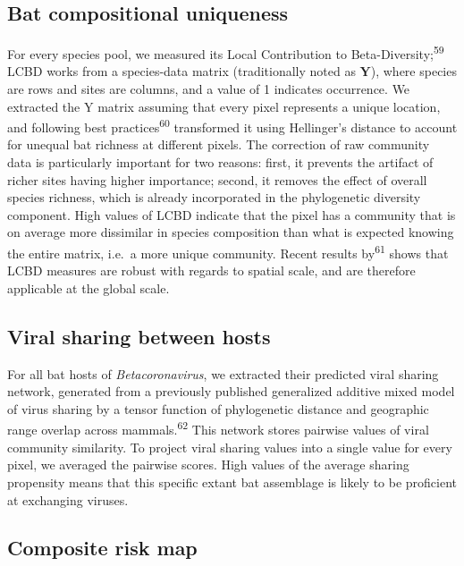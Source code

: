\documentclass[11pt]{article}
\begin{document}
\hypertarget{bat-compositional-uniqueness}{%
\subsection{Bat compositional
uniqueness}\label{bat-compositional-uniqueness}}

For every species pool, we measured its Local Contribution to
Beta-Diversity;\textsuperscript{59} LCBD works from a species-data
matrix (traditionally noted as \(\mathbf{Y}\)), where species are rows
and sites are columns, and a value of 1 indicates occurrence. We
extracted the Y matrix assuming that every pixel represents a unique
location, and following best practices\textsuperscript{60} transformed
it using Hellinger's distance to account for unequal bat richness at
different pixels. The correction of raw community data is particularly
important for two reasons: first, it prevents the artifact of richer
sites having higher importance; second, it removes the effect of overall
species richness, which is already incorporated in the phylogenetic
diversity component. High values of LCBD indicate that the pixel has a
community that is on average more dissimilar in species composition than
what is expected knowing the entire matrix, i.e.~a more unique
community. Recent results by\textsuperscript{61} shows that LCBD
measures are robust with regards to spatial scale, and are therefore
applicable at the global scale.

\hypertarget{viral-sharing-between-hosts}{%
\subsection{Viral sharing between
hosts}\label{viral-sharing-between-hosts}}

For all bat hosts of \emph{Betacoronavirus}, we extracted their
predicted viral sharing network, generated from a previously published
generalized additive mixed model of virus sharing by a tensor function
of phylogenetic distance and geographic range overlap across
mammals.\textsuperscript{62} This network stores pairwise values of
viral community similarity. To project viral sharing values into a
single value for every pixel, we averaged the pairwise scores. High
values of the average sharing propensity means that this specific extant
bat assemblage is likely to be proficient at exchanging viruses.

\hypertarget{composite-risk-map}{%
\subsection{Composite risk map}\label{composite-risk-map}}
\end{document}
